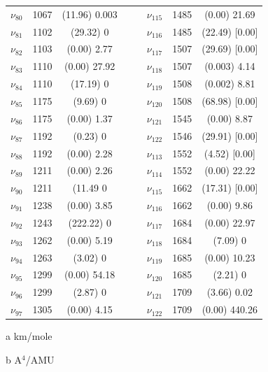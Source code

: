 \begin{table}[H]
\begin{center}
\begin{threeparttable}
\begin{tabular}{c c c c c c c c}
$\nu_{80}$&  1067 & (11.96)  0.003 &  &  & $\nu_{115}$ & 1485 & (0.00) 21.69 \\ 
$\nu_{81}$&  1102 & (29.32)  0 &  &  & $\nu_{116}$&  1485 & (22.49)  [0.00] \\ 
$\nu_{82}$&  1103 & (0.00)  2.77 &  &  & $\nu_{117}$& 1507 & (29.69)  [0.00] \\ 
$\nu_{83}$&  1110 & (0.00)  27.92 &  &  & $\nu_{118}$ & 1507 & (0.003)  4.14 \\ 
$\nu_{84}$&  1110 & (17.19)  0 &  &  & $\nu_{119}$&  1508 & (0.002)  8.81 \\ 
$\nu_{85}$&  1175 & (9.69)  0 &  &  & $\nu_{120}$&  1508 & (68.98)  [0.00] \\ 
$\nu_{86}$& 1175 & (0.00)  1.37 &  &  & $\nu_{121}$ & 1545 & (0.00)  8.87 \\ 
$\nu_{87}$&  1192 & (0.23)  0 &  &  & $\nu_{122}$&  1546 & (29.91)  [0.00] \\ 
$\nu_{88}$&  1192 & (0.00)  2.28 &  &  & $\nu_{113}$ & 1552 & (4.52)  [0.00] \\ 
$\nu_{89}$&  1211 & (0.00)  2.26 &  &  & $\nu_{114}$ & 1552 & (0.00)  22.22 \\ 
$\nu_{90}$& 1211 & (11.49 0 &  & &  $\nu_{115}$&  1662 & (17.31)  [0.00]\\ 
$\nu_{91}$&  1238 & (0.00)  3.85 &  &  & $\nu_{116}$ & 1662 & (0.00)  9.86 \\ 
$\nu_{92}$&  1243 & (222.22)  0 &  &  & $\nu_{117}$& 1684 & (0.00) 22.97 \\ 
$\nu_{93}$&  1262 & (0.00)  5.19 &  &  & $\nu_{118}$ & 1684 & (7.09)  0 \\ 
$\nu_{94}$&  1263 & (3.02)  0 &  &  & $\nu_{119}$&  1685 & (0.00)  10.23 \\ 
$\nu_{95}$&  1299 & (0.00)  54.18 &  &  & $\nu_{120}$ & 1685 & (2.21)  0 \\ 
$\nu_{96}$&  1299 & (2.87)  0 &  &  & $\nu_{121}$&  1709 & (3.66)  0.02 \\ 
$\nu_{97}$&  1305 & (0.00)  4.15 &  &  & $\nu_{122}$&  1709 & (0.00)  440.26 \\ 
		\bottomrule
	\end{tabular}
	
	\begin{tablenotes}
		\item[a] km/mole
		\item[b] A$^{4}$/AMU
	\end{tablenotes}
\end{threeparttable}
\end{center}
\label{freq46-dmDibenfDi}
\end{table}



